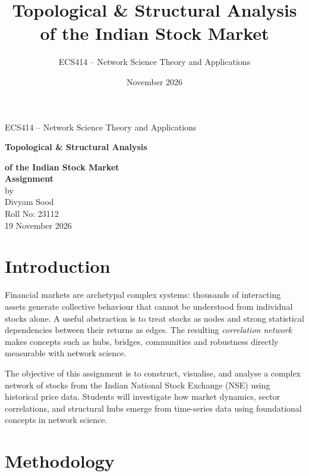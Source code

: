 \documentclass[11pt,a4paper]{article}
\title{Topological \& Structural Analysis of the Indian Stock Market}
\author{ECS414 -- Network Science Theory and Applications}
\date{November 2026}
\begin{document}
\begin{titlepage}
\centering
\vspace*{3.5cm}
{\Large ECS414 -- Network Science Theory and Applications}\\[1.0cm]
{\Huge\bfseries Topological \& Structural Analysis\par}
{\Huge\bfseries of the Indian Stock Market}\\[2.1cm]
{\LARGE\bfseries Assignment}\\[2.5cm]
{\large by}\\[2.4cm]
{\large Divyam Sood}\\[0.4cm]
{\large Roll No: 23112}\\[4.4cm]
{\large 19 November 2026}
\vfill
\end{titlepage}

\tableofcontents
\newpage

\section{Introduction}
\label{sec:intro}
Financial markets are archetypal complex systems: thousands of interacting
assets generate collective behaviour that cannot be understood from individual
stocks alone. A useful abstraction is to treat stocks as nodes and strong
statistical dependencies between their returns as edges. The resulting
\emph{correlation network} makes concepts such as hubs, bridges, communities
and robustness directly measurable with network science.

The objective of this assignment is to construct, visualise, and analyse a complex network of stocks from the Indian National Stock Exchange (NSE) using historical price data. Students will investigate how market dynamics, sector
correlations, and structural hubs emerge from time-series data using foundational concepts in network
science.

\section{Methodology}
\label{sec:methods}
\end{document}

